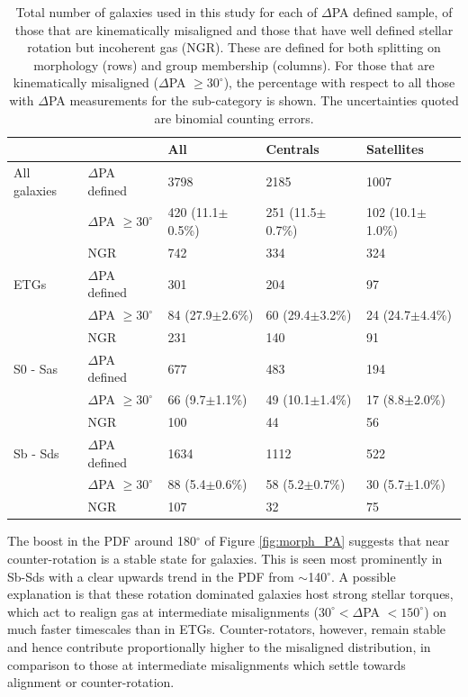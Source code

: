 \begin{table}
\begin{tabular}{lllll}
\hline
        &  & All & Centrals & Satellites \\
\hline
All galaxies & $\Delta$PA defined &  3798 &  2185 &  1007 \\
& $\Delta$PA $\geq 30^{\circ}$ &  420 (11.1$\pm$0.5\%) &  251 (11.5$\pm$0.7\%) &  102 (10.1$\pm$1.0\%) \\
& NGR & 742 &  334 &  324 \\

ETGs & $\Delta$PA defined & 301 & 204 & 97 \\
& $\Delta$PA $\geq 30^{\circ}$ & 84 (27.9$\pm$2.6\%) & 60 (29.4$\pm$3.2\%) & 24 (24.7$\pm$4.4\%)  \\
& NGR & 231 & 140 & 91 \\

S0 - Sas & $\Delta$PA defined & 677 & 483 & 194 \\
& $\Delta$PA $\geq 30^{\circ}$ &  66 (9.7$\pm$1.1\%) & 49 (10.1$\pm$1.4\%) & 17 (8.8$\pm$2.0\%) \\
& NGR & 100 & 44 & 56 \\

Sb - Sds & $\Delta$PA defined & 1634 & 1112 & 522 \\
& $\Delta$PA $\geq 30^{\circ}$ & 88 (5.4$\pm$0.6\%) & 58 (5.2$\pm$0.7\%) & 30 (5.7$\pm$1.0\%) \\
& NGR & 107 & 32 & 75 \\

\end{tabular}
\caption{Total number of galaxies used in this study for each of $\Delta$PA defined sample, of those that are kinematically misaligned and those that have well defined stellar rotation but incoherent gas (NGR). These are defined for both splitting on morphology (rows) and group membership (columns). For those that are kinematically misaligned ($\Delta$PA $\geq 30^{\circ}$), the percentage with respect to all those with $\Delta$PA measurements for the sub-category is shown. The uncertainties quoted are binomial counting errors.}
\label{tab:mega_table}
\end{table}

The boost in the PDF around 180$^{\circ}$ of Figure \ref{fig:morph_PA} suggests that near counter-rotation is a stable state for galaxies. This is seen most prominently in Sb-Sds with a clear upwards trend in the PDF from $\sim$140$^{\circ}$. A possible explanation is that these rotation dominated galaxies host strong stellar torques, which act to realign gas at intermediate misalignments ($30^{\circ} < \Delta$PA $ < 150^{\circ}$) on much faster timescales than in ETGs. Counter-rotators, however, remain stable and hence contribute proportionally higher to the misaligned distribution, in comparison to those at intermediate misalignments which settle towards alignment or counter-rotation.

